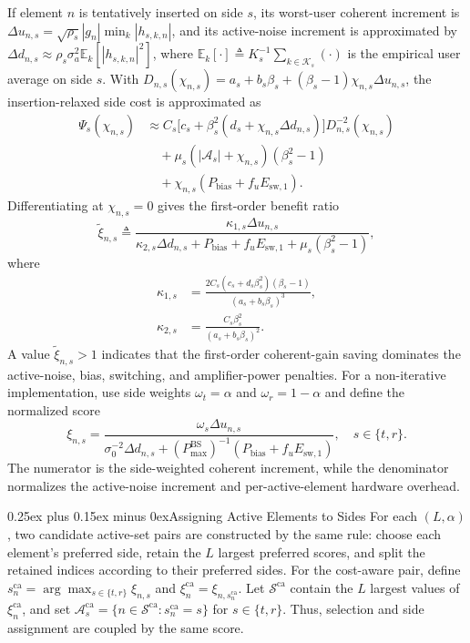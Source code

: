 \documentclass[journal]{IEEEtran}
\makeatletter
\def\subsection{\@startsection{subsection}{2}{\z@}{1.05ex plus 0.35ex minus 0.2ex}%
{0.25ex plus 0.15ex minus 0ex}{\normalfont\normalsize\itshape}}%
\makeatother
\begin{document}
If element $n$ is tentatively inserted on side $s$, its worst-user coherent increment is $\Delta u_{n,s}=\sqrt{\rho_s}|g_n|\min_k|h_{s,k,n}|$, and its active-noise increment is approximated by $\Delta d_{n,s}\approx\rho_s\sigma_a^2\mathbb E_k[|h_{s,k,n}|^2]$, where $\mathbb E_k[\cdot]\triangleq K_s^{-1}\sum_{k\in\mathcal K_s}(\cdot)$ is the empirical user average on side $s$. With $D_{n,s}(\chi_{n,s})=a_s+b_s\beta_s+(\beta_s-1)\chi_{n,s}\Delta u_{n,s}$, the insertion-relaxed side cost is approximated as
\[
\begin{aligned}
\Psi_s(\chi_{n,s})
&\approx C_s\big[c_s+\beta_s^2(d_s+\chi_{n,s}\Delta d_{n,s})\big]
D_{n,s}^{-2}(\chi_{n,s}) \\
&\quad +\mu_s(|\mathcal A_s|+\chi_{n,s})(\beta_s^2-1) \\
&\quad +\chi_{n,s}(P_{\mathrm{bias}}+f_uE_{\mathrm{sw},1}).
\end{aligned}
\]
Differentiating at $\chi_{n,s}=0$ gives the first-order benefit ratio
\[
\tilde{\xi}_{n,s}\triangleq
\frac{\kappa_{1,s}\Delta u_{n,s}}
{\kappa_{2,s}\Delta d_{n,s}+P_{\mathrm{bias}}+f_uE_{\mathrm{sw},1}+\mu_s(\beta_s^2-1)},
\]
where
\[
\begin{aligned}
\kappa_{1,s}&=\frac{2C_s(c_s+d_s\beta_s^2)(\beta_s-1)}{(a_s+b_s\beta_s)^3},\\
\kappa_{2,s}&=\frac{C_s\beta_s^2}{(a_s+b_s\beta_s)^2}.
\end{aligned}
\]
A value $\tilde{\xi}_{n,s}>1$ indicates that the first-order coherent-gain saving dominates the active-noise, bias, switching, and amplifier-power penalties. For a non-iterative implementation, use side weights $\omega_t=\alpha$ and $\omega_r=1-\alpha$ and define the normalized score
\begingroup\small
\begin{equation}
\xi_{n,s}=\frac{\omega_s\Delta u_{n,s}}
{\sigma_0^{-2}\Delta d_{n,s}+(P_{\max}^{\mathrm{BS}})^{-1}(P_{\mathrm{bias}}+f_uE_{\mathrm{sw},1})},\quad s\in\{t,r\}.
\label{eq:score}
\end{equation}
\endgroup
The numerator is the side-weighted coherent increment, while the denominator normalizes the active-noise increment and per-active-element hardware overhead.

\subsection{Assigning Active Elements to Sides}
For each $(L,\alpha)$, two candidate active-set pairs are constructed by the same rule: choose each element's preferred side, retain the $L$ largest preferred scores, and split the retained indices according to their preferred sides. For the cost-aware pair, define $s_n^{\mathrm{ca}}=\arg\max_{s\in\{t,r\}}\xi_{n,s}$ and $\xi_n^{\mathrm{ca}}=\xi_{n,s_n^{\mathrm{ca}}}$. Let $\mathcal S^{\mathrm{ca}}$ contain the $L$ largest values of $\xi_n^{\mathrm{ca}}$, and set $\mathcal A_s^{\mathrm{ca}}=\{n\in\mathcal S^{\mathrm{ca}}:s_n^{\mathrm{ca}}=s\}$ for $s\in\{t,r\}$. Thus, selection and side assignment are coupled by the same score.
\end{document}
